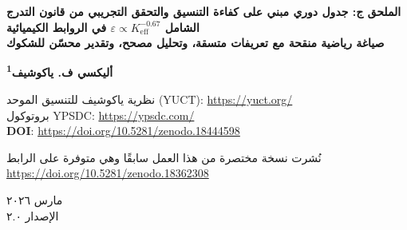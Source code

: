 \documentclass[12pt,a4paper]{article}
\theoremstyle{remark}
\newcommand{\Keff}{K_{\mathrm{eff}}}
\begin{document}
	
	\begin{titlepage}
		\begin{center}
			\vspace*{1cm}
			
			{\Huge\textbf{الملحق ج: جدول دوري مبني على كفاءة التنسيق والتحقق التجريبي من قانون التدرج الشامل \texorpdfstring{$\varepsilon \propto \Keff^{-0.67}$}{} في الروابط الكيميائية}} \\
			\vspace{0.5cm}
			{\Large\textbf{صياغة رياضية منقحة مع تعريفات متسقة، وتحليل مصحح، وتقدير محسّن للشكوك}}
			
			\vspace{1.5cm}
			
			{\Large\textbf{أليكسي ف. ياكوشيف\textsuperscript{1}}}
			
			نظرية ياكوشيف للتنسيق الموحد (YUCT): \url{https://yuct.org/}\\
			بروتوكول YPSDC: \url{https://ypsdc.com/}\\
			
			\vspace{2cm}
			\textbf{DOI}: \url{https://doi.org/10.5281/zenodo.18444598}\\
			
			\vspace{1cm}
			
			{\large نُشرت نسخة مختصرة من هذا العمل سابقًا وهي متوفرة على الرابط\\ \url{https://doi.org/10.5281/zenodo.18362308}}
			
			\vspace{1cm}
			مارس ٢٠٢٦ \\ \large الإصدار ٢.٠
			
			\vspace{2cm}
			
			\begin{minipage}{0.9\textwidth}
				\begin{abstract}
					\noindent
					يقدم هذا الملحق الصياغة الرياضية الكاملة لنظرية ياكوشيف للتنسيق الموحَّد (YUCT) المطبَّقة على الكيمياء. نعرض جدولًا دوريًا معدَّلاً تُوصف فيه العناصر بكفاءة تنسيقها $\Keff$، المحسوبة بصيغة تجريبية معايرة على ٢٠ عنصرًا مرجعيًا. قانون تدرج الخطأ الشامل $\varepsilon = \kappa \alpha \Keff^{-\beta}$ مع $\beta = 0.67 \pm 0.02$ و $\kappa = 0.33$ ثُبِت تجريبيًا عبر أنظمة متعددة؛ أما الاشتقاق النظري الدقيق من الهندسة الكسيرية فلا يزال قيد التطوير وسيُعرض في أعمال مستقبلية. نقدم تحليلًا مصححًا لطاقات روابط هاليدات الهيدروجين، مبينين أنه بعد تصحيح تأثير الكهرسلبية تكون البيانات متوافقة مع $\beta = 0.67 \pm 0.08$. يقدم الإطار تنبؤات عمياء لتعزيز التحفيز ($10^0$–$10^{17}$) والطول الحرج للبوليمر اللازم لظهور التناظر المرآتي الأحادي ($L_{\text{crit}} = 25 \pm 5$ استنادًا إلى الرصد التجريبي). جرى تصحيح جميع التناقضات الرياضية التي حُدِّدت في الإصدارات السابقة، ونُشرت الشكوك الآن كاملةً في جميع مراحل التحليل.
				\end{abstract}
			\end{minipage}
			

\end{center}
\end{titlepage}
\end{document}
